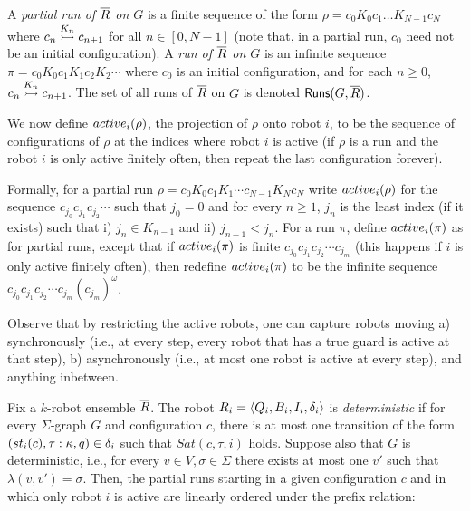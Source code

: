 A \emph{partial run of $\tup{R}$ on $G$} is a finite sequence of the form $\rho = c_0 K_0 c_1 \dots K_{N-1} c_N$
where $\onestep{c_n}{c_{n+1}}{K_n}$ for all $n \in [0,N-1]$ (note that, in a partial run, $c_0$ need not be an initial configuration).
A \emph{run of $\tup{R}$ on $G$} is an infinite sequence $\pi = c_0 K_0 c_1 K_1 c_2 K_2 \cdots$ where $c_0$ is an initial configuration, and for each $n \geq 0$, $\onestep{c_n}{c_{n+1}}{K_n}$.  The set of all runs of $\tup{R}$ on $G$ is denoted $\runs(G,\tup{R})$.

 We now define
$\activeproj_i(\rho)$, the projection of $\rho$ onto robot $i$, to be
the sequence of configurations of $\rho$ at the indices where robot $i$ is
active (if $\rho$ is a run and the robot $i$ is only active finitely often,
then repeat the last configuration forever).

Formally, for a partial run $\rho = c_0 K_0 c_1 K_1 \cdots c_{N-1} K_N c_N$ write $\activeproj_i(\rho)$ for the
sequence $c_{j_0} c_{j_1} c_{j_2} \cdots$ such that $j_0 = 0$
and for every $n\geq 1$, $j_n$ is the least index (if it exists) such that i) $j_n \in K_{n-1}$ and ii) $j_{n-1} < j_n$.
For a run $\pi$, define $\activeproj_i(\pi)$ as for partial runs, except that if
$\activeproj_i(\pi)$ is finite $c_{j_0} c_{j_1} c_{j_2} \cdots c_{j_m}$ (this happens if $i$ is only active finitely often), then redefine
$\activeproj_i(\pi)$ to be the infinite sequence $c_{j_0} c_{j_1} c_{j_2} \cdots c_{j_m} (c_{j_m})^\omega$.


\begin{remark}
Observe that by restricting the active robots, one can capture robots moving a) synchronously (i.e., at every step, every robot that has a true guard is active at that step), b) asynchronously (i.e., at most one robot is active at every step), and anything inbetween.
\end{remark}

Fix a $k$-robot ensemble $\tup{R}$. The robot $R_i = \tpl{Q_i,B_i,I_i,\delta_i}$ is \emph{deterministic} if for every $\Sigma$-graph $G$ and configuration $c$,
there is at most one transition of the form $(st_i(c),\gc{\tau}{\kappa},q) \in \delta_i$ such that $Sat(c,\tau,i)$ holds. Suppose also that $G$ is deterministic, i.e., for every $v \in V, \sigma \in \Sigma$ there exists at most one $v'$ such that $\lambda(v,v') = \sigma$. Then, the partial runs starting in a given configuration $c$ and in which only robot $i$ is active are linearly ordered under the prefix relation:

